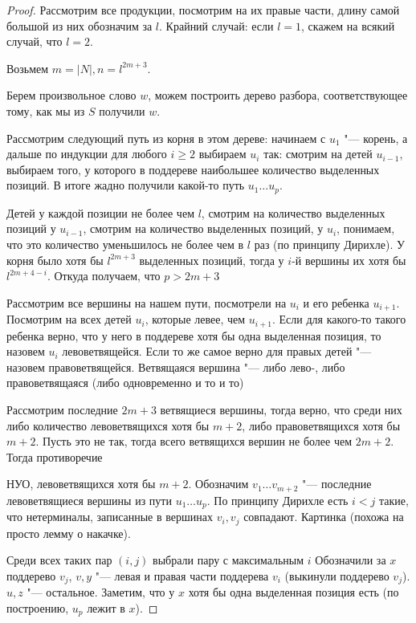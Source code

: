 \begin{proof}
Рассмотрим все продукции, посмотрим на их правые части, длину самой большой из них обозначим за $l$.
Крайний случай: если $l = 1$, скажем на всякий случай, что $l = 2$.

Возьмем $m = |N|, n = l^{2m+3}$.

Берем произвольное слово $w$, можем построить дерево разбора, соответствующее тому, как мы из $S$ получили $w$.

Рассмотрим следующий путь из корня в этом дереве: начинаем с $u_1$ "--- корень, а дальше по индукции для любого $i \geq 2$ выбираем $u_i$ так: 
смотрим на детей $u_{i-1}$, выбираем того, у которого в поддереве наибольшее количество выделенных позиций.
В итоге жадно получили какой-то путь $u_1 \dots u_p$.

Детей у каждой позиции не более чем $l$, смотрим на количество выделенных позиций у $u_{i-1}$, смотрим на количество выделенных позиций, у $u_i$,
понимаем, что это количество уменьшилось не более чем в $l$ раз (по принципу Дирихле).
У корня было хотя бы $l^{2m+3}$ выделенных позиций, тогда у $i$-й вершины их хотя бы $l^{2m+4-i}$.
Откуда получаем, что $p > 2m+3$ %

Рассмотрим все вершины на нашем пути, посмотрели на $u_i$ и его ребенка $u_{i+1}$. 
Посмотрим на всех детей $u_i$, которые левее, чем $u_{i+1}$. 
Если для какого-то такого ребенка верно, что у него в поддереве хотя бы одна выделенная позиция, то назовем $u_i$ левоветвящейся.
Если то же самое верно для правых детей "--- назовем правоветвящейся.
Ветвящаяся вершина "--- либо лево-, либо правоветвящаяся (либо одновременно и то и то)

Рассмотрим последние $2m + 3$ ветвящиеся вершины, тогда верно, что среди них либо количество левоветвящихся хотя бы $m + 2$, либо правоветвящихся хотя бы $m + 2$.
Пусть это не так, тогда всего ветвящихся вершин не более чем $2m + 2$.
Тогда противоречие %


НУО, левоветвящихся хотя бы $m + 2$. Обозначим $v_1 \dots v_{m+2}$ "--- последние левоветвящиеся вершины из пути $u_1 \dots u_p$.
По принципу Дирихле есть $i < j$ такие, что нетерминалы, записанные в вершинах $v_i, v_j$ совпадают.
\TODO Картинка (похожа на просто лемму о накачке).

Среди всех таких пар $(i, j)$ выбрали пару с максимальным $i$
Обозначили за $x$ поддерево $v_j$, $v, y$ "--- левая и правая части поддерева $v_i$ (выкинули поддерево $v_j$). 
$u, z$ "--- остальное. 
Заметим, что у $x$ хотя бы одна выделенная позиция есть (по построению, $u_p$ лежит в $x$).


\end{proof}
